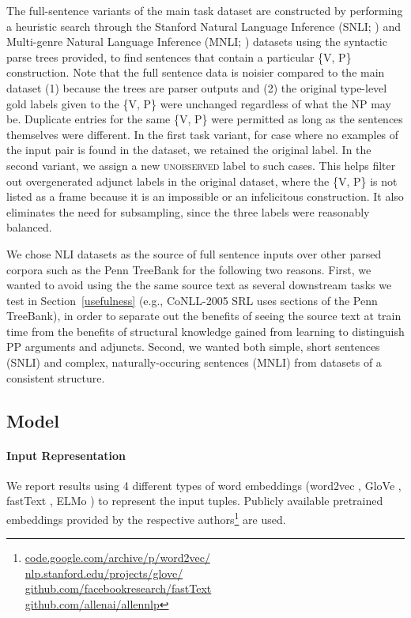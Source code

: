 \documentclass[letterpaper]{article} %
\begin{document}
The full-sentence variants of the main task dataset are constructed by performing a heuristic search through the Stanford Natural Language Inference (SNLI; \cite{bowman2015large}) and Multi-genre Natural Language Inference (MNLI; \cite{williams2018broad}) datasets using the syntactic parse trees provided, to find sentences that contain a particular \{\textsc{V, P}\} construction. Note that the full sentence data is noisier compared to the main dataset (1) because the trees are parser outputs and (2) the original type-level gold labels given to the \{\textsc{V, P}\} were unchanged regardless of what the NP may be. Duplicate entries for the same \{\textsc{V, P}\} were permitted as long as the sentences themselves were different. In the first task variant, for case where no examples of the input pair is found in the dataset, we retained the original label. In the second variant, we assign a new \textsc{unobserved} label to such cases. This helps filter out overgenerated adjunct labels in the original dataset, where the \{\textsc{V, P}\} is not listed as a frame because it is an impossible or an infelicitous construction. It also eliminates the need for subsampling, since the three labels were reasonably balanced.

We chose NLI datasets as the source of full sentence inputs over other parsed corpora such as the Penn TreeBank for the following two reasons. First, we wanted to avoid using the the same source text as several downstream tasks we test in Section~\ref{usefulness} (e.g., CoNLL-2005 SRL \cite{carreras2005introduction} uses sections of the Penn TreeBank), in order to separate out the benefits of seeing the source text at train time from the benefits of structural knowledge gained from learning to distinguish PP arguments and adjuncts. Second, we wanted both simple, short sentences (SNLI) and complex, naturally-occuring sentences (MNLI) from datasets of a consistent structure.

\subsection{Model}
\label{ex1:model}
\paragraph{Input Representation} We report results using 4 different types of word embeddings (word2vec \cite{mikolov2013efficient}, GloVe \cite{pennington2014glove}, fastText \cite{bojanowski2016enriching}, ELMo \cite{peters2018deep}) to represent the input tuples. Publicly available pretrained embeddings provided by the respective authors\footnote{\url{code.google.com/archive/p/word2vec/}\\ \url{nlp.stanford.edu/projects/glove/}\\
\url{github.com/facebookresearch/fastText} \\
\url{github.com/allenai/allennlp}} are used.
\end{document}
